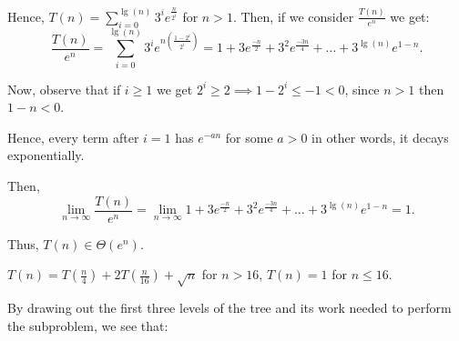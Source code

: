 \begin{questions}
\begin{soln}
		Hence, \(T(n) = \sum_{i=0}^{\lg(n)} 3^i e^{\frac{n}{2^i}}\) for \(n > 1\). Then, if we consider \(\frac{T(n)}{e^n}\) we get:
		\[
			\frac{T(n)}{e^n} = \sum_{i=0}^{\lg(n)}3^i e^{n\left(\frac{1 - 2^i}{2^i}\right)} = 1 + 3e^{\frac{-n}{2}} + 3^2e^{\frac{-3n}{4}} + \dots + 3^{\lg(n)}e^{1-n}.
		\]

		Now, observe that if \(i \geq 1\) we get \(2^i \geq 2 \implies 1 - 2^i \leq -1 < 0\), since \(n > 1\) then \(1 - n < 0\).

		Hence, every term after \(i = 1\) has \(e^{-an}\) for some \(a > 0\) in other words, it decays exponentially.

		Then,
		\[
			\lim_{n \to \infty} \frac{T(n)}{e^n} = \lim_{n \to \infty} 1 + 3e^{\frac{-n}{2}} + 3^2e^{\frac{-3n}{4}} + \dots + 3^{\lg(n)}e^{1-n} = 1.
		\]

		Thus, \(T(n) \in \Theta (e^n)\).

	\end{soln}

	\question[3] $T(n) = T\left( \frac{n}{4} \right) + 2T\left( \frac{n}{16} \right) + \sqrt{n}$ for $n > 16$, $T(n) = 1$ for $n \le 16$.

	\ifsolutions\fi
	\begin{soln}
		By drawing out the first three levels of the tree and its work needed to perform the subproblem, we see that:





\end{soln}
\end{questions}
